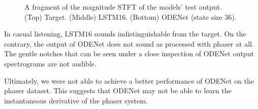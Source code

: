 \newcommand{\scaleboxsizee}{0.8}
\begin{figure}
    \centering
    \begin{subfigure}{0.7\textwidth}
        \centering
        \scalebox{0.81}{}
    \end{subfigure}
    \begin{subfigure}{0.7\textwidth}
        \centering
        \scalebox{\scaleboxsizee}{}
    \end{subfigure}
    \begin{subfigure}{0.7\textwidth}
        \centering
        \scalebox{\scaleboxsizee}{}
    \end{subfigure}
    \caption{A fragment of the magnitude \ac{STFT} of the models' test output. (Top) Target. (Middle) \ac{LSTM}16. (Bottom) ODENet (state size 36).}
    \label{fig:phaser_test_spectrograms}
\end{figure}

In casual listening, \ac{LSTM}16 sounds indistinguishable from the target. On the contrary, the output of ODENet does not sound as processed with phaser at all. The gentle notches that can be seen under a close inspection of ODENet output spectrograms are not audible.

Ultimately, we were not able to achieve a better performance of ODENet on the phaser dataset. This suggests that ODENet may not be able to learn the instantaneous derivative of the phaser system.
